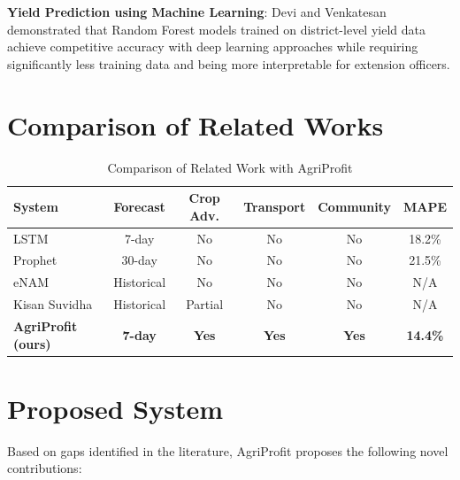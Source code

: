 \documentclass[12pt,a4paper]{report}
\begin{document}
\textbf{Yield Prediction using Machine Learning}: Devi and Venkatesan~\cite{yieldrf2019}
demonstrated that Random Forest models trained on district-level yield data achieve
competitive accuracy with deep learning approaches while requiring significantly less
training data and being more interpretable for extension officers.

\section{Comparison of Related Works}

\begin{table}[H]
\centering
\caption{Comparison of Related Work with AgriProfit}
\label{tab:litcomp}
\begin{tabular}{|l|c|c|c|c|c|}
\hline
\textbf{System} & \textbf{Forecast} & \textbf{Crop Adv.} & \textbf{Transport} & \textbf{Community} & \textbf{MAPE} \\
\hline
LSTM \cite{lstm2020} & 7-day & No & No & No & 18.2\% \\
Prophet \cite{prophetagri} & 30-day & No & No & No & 21.5\% \\
eNAM & Historical & No & No & No & N/A \\
Kisan Suvidha & Historical & Partial & No & No & N/A \\
\textbf{AgriProfit (ours)} & \textbf{7-day} & \textbf{Yes} & \textbf{Yes} & \textbf{Yes} & \textbf{14.4\%} \\
\hline
\end{tabular}
\end{table}

\section{Proposed System}

Based on gaps identified in the literature, AgriProfit proposes the following novel
contributions:
\end{document}
